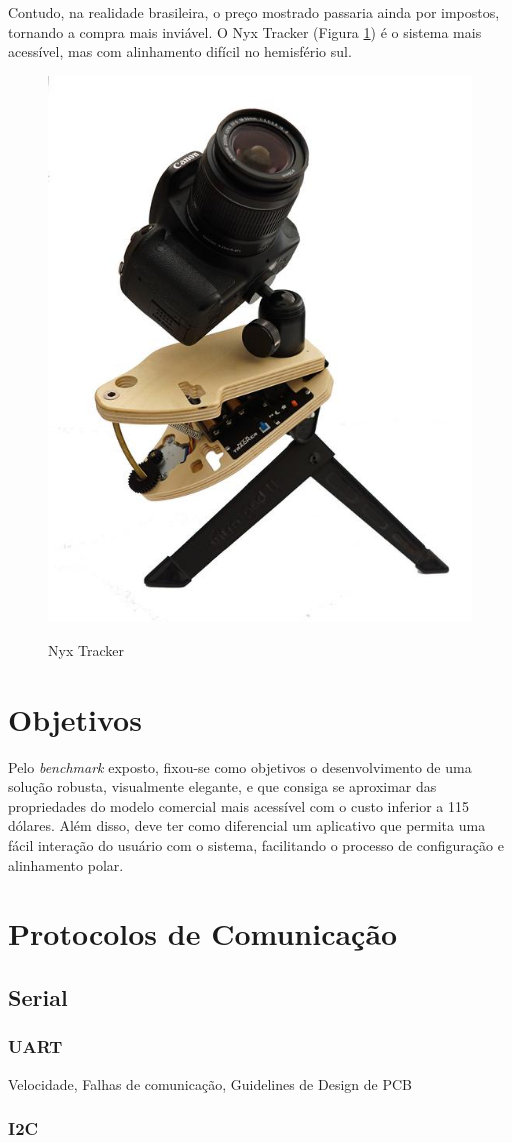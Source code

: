 Contudo, na realidade brasileira, o preço mostrado passaria ainda por impostos, tornando a compra mais inviável. O Nyx Tracker (Figura \ref{fig:nyxtracker}) é o sistema mais acessível, mas com alinhamento difícil no hemisfério sul.

\begin{figure}[h]
	\centering
	\caption{Nyx Tracker}
	\includegraphics[width=0.3\linewidth]{figuras/nyxtracker}
	\label{fig:nyxtracker}
\end{figure}


\section{Objetivos}

Pelo \textit{benchmark} exposto, fixou-se como objetivos o desenvolvimento de uma solução robusta, visualmente elegante, e que consiga se aproximar das propriedades do modelo comercial mais acessível com o custo inferior a 115 dólares. Além disso, deve ter como diferencial um aplicativo que permita uma fácil interação do usuário com o sistema, facilitando o processo de configuração e alinhamento polar.

\section{Protocolos de Comunicação}

\subsection{Serial}
\subsubsection{UART}
Velocidade, Falhas de comunicação, Guidelines de Design de PCB

\subsubsection{I2C}

